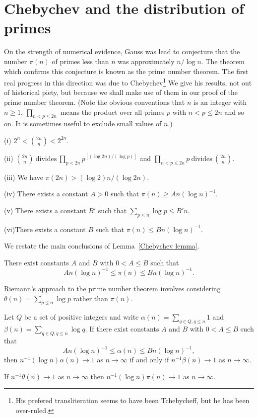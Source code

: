 \section{Chebychev and the distribution of primes}
On the strength of numerical evidence, Gauss was
lead to conjecture that the number $\pi(n)$
of primes less than $n$
was approximately $n/\log n$. The theorem which
confirms this conjecture is known as the
prime number theorem.
The first real
progress in this direction was due to 
Chebychev\footnote{His prefered transliteration
seems to have been Tchebycheff, but he has
been over-ruled.} We give his results, not out
of historical piety, but because we shall make
use of them in our proof of the prime number
theorem. (Note the obvious conventions that
$n$ is an integer with $n\geq 1$,
$\prod_{n<p\leq 2n}$ means the product over all primes 
$p$ with $n<p\leq 2n$ and so on. It is sometimes
useful to exclude small values of $n$.)
\begin{lemma}\label{Chebychev lemma} (i) ${\displaystyle
2^{n}<\binom{2n}{n}<2^{2n}}$.

(ii) ${\displaystyle \binom{2n}{n}\ \text{divides}
\ \prod_{p<2n} p^{[(\log 2n)/(\log p)]}}$
and 
${\displaystyle \prod_{n<p\leq 2n} p\ \text{divides}
\ \binom{2n}{n}}$.

(iii) We have $\pi(2n)>(\log 2)n/(\log 2n)$.

(iv)  There exists a constant $A>0$ such that
$\pi(n)\geq An(\log n)^{-1}$.

(v) There exists a constant $B'$ such that
$\sum_{p\leq n} \log p\leq B'n$.

(vi)There exists a constant $B$ such that
$\pi(n)\leq Bn(\log n)^{-1}$.
\end{lemma}
We restate the main conclusions of Lemma~\ref{Chebychev lemma}.
\begin{theorem}[Chebychev]\label{Chebychev theorem} 
There exist constants $A$ and $B$
with $0<A\leq B$ such that
\[An(\log n)^{-1}\leq\pi(n)\leq Bn(\log n)^{-1}.\]
\end{theorem}

Riemann's approach to the prime number theorem involves
considering $\theta(n)=\sum_{p\leq n}\log p$ rather than
$\pi(n)$.
\begin{lemma} Let $Q$ be a set of positive integers
and write $\alpha(n)=\sum_{q\in Q,q\leq n} 1$ 
and $\beta(n)=\sum_{q\in Q,q\leq n} \log q$.
If there exist constants $A$ and $B$ with
$0<A\leq B$ such that
\[An(\log n)^{-1}\leq\alpha(n)\leq Bn(\log n)^{-1},\]
then $n^{-1}(\log n)\alpha(n)\rightarrow 1$
as $n\rightarrow\infty$
if and only if $n^{-1}\beta(n)\rightarrow 1$
as $n\rightarrow\infty$.
\end{lemma}
\begin{lemma}\label{logarithm transfer}
If $n^{-1}\theta(n)\rightarrow 1$
as $n\rightarrow\infty$ then
$n^{-1}(\log n)\pi(n)\rightarrow 1$
as $n\rightarrow\infty$.
\end{lemma}
